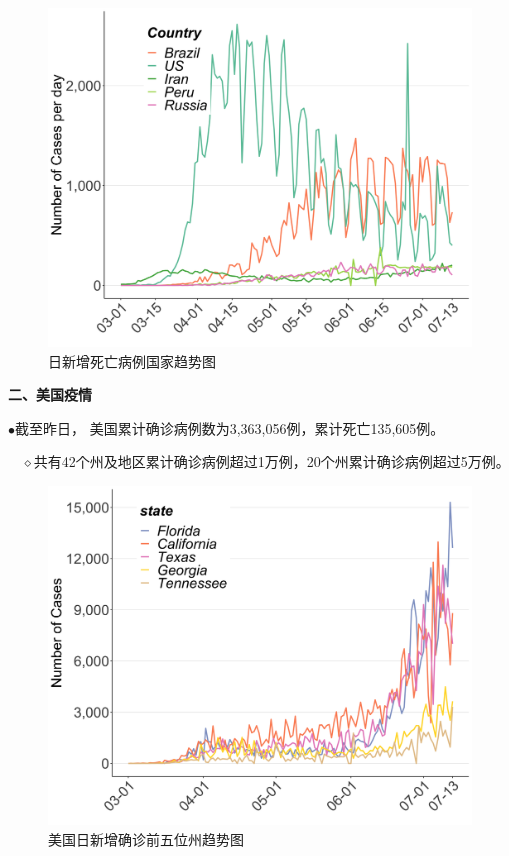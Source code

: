 \documentclass[]{article}
\begin{document}
\begin{figure}[H]
\centering
{}
\caption{日新增死亡病例国家趋势图}
\includegraphics[]{./input/covid3.png}
\end{figure}

\vspace{-7mm}

\begin{huge}{\textcolor{glaucous}{\textbf {二、美国疫情}}}\end{huge}

\(\bullet\)截至昨日，
美国累计确诊病例数为3,363,056例，累计死亡135,605例。

\(\quad\)\(\diamond\)共有42个州及地区累计确诊病例超过1万例，20个州累计确诊病例超过5万例。

\begin{figure}[H]
\centering
{}
\caption{美国日新增确诊前五位州趋势图}
\includegraphics[]{./input/covid5.png}
\end{figure}
\end{document}
